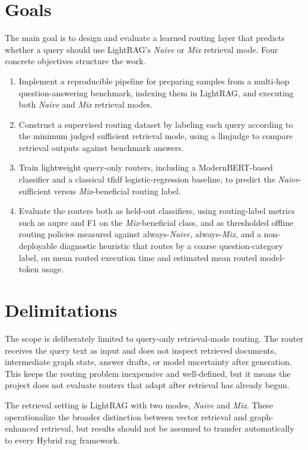 \documentclass[english, bibtex]{kththesis}               %
\numberwithin{listing}{chapter}
\begin{document}
\section{Goals}
\label{sec:goals}
The main goal is to design and evaluate a learned routing layer that predicts whether a query should use LightRAG's \emph{Naive} or \emph{Mix} retrieval mode. Four concrete objectives structure the work.

\begin{enumerate}
\item Implement a reproducible pipeline for preparing samples from a multi-hop question-answering benchmark, indexing them in LightRAG, and executing both \emph{Naive} and \emph{Mix} retrieval modes.
\item Construct a supervised routing dataset by labeling each query according to the minimum judged sufficient retrieval mode, using a \gls{llmjudge} to compare retrieval outputs against benchmark answers.
\item Train lightweight query-only routers, including a ModernBERT-based classifier and a classical \gls{tfidf} logistic-regression baseline, to predict the \emph{Naive}-sufficient versus \emph{Mix}-beneficial routing label.
\item Evaluate the routers both as held-out classifiers, using routing-label metrics such as \gls{auprc} and F1 on the \emph{Mix}-beneficial class, and as thresholded offline routing policies measured against always-\emph{Naive}, always-\emph{Mix}, and a non-deployable diagnostic heuristic that routes by a coarse question-category label, on mean routed execution time and estimated mean routed model-token usage.
\end{enumerate}

\section{Delimitations}
\label{sec:delimitations}

The scope is deliberately limited to query-only retrieval-mode routing. The router receives the query text as input and does not inspect retrieved documents, intermediate graph state, answer drafts, or model uncertainty after generation. This keeps the routing problem inexpensive and well-defined, but it means the project does not evaluate routers that adapt after retrieval has already begun.

The retrieval setting is LightRAG with two modes, \emph{Naive} and \emph{Mix}. These operationalize the broader distinction between vector retrieval and graph-enhanced retrieval, but results should not be assumed to transfer automatically to every Hybrid \gls{rag} framework.
\end{document}
